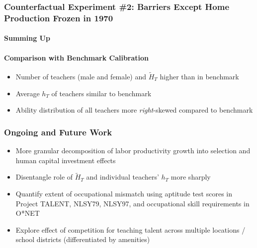 \documentclass[11pt,hyperref={bookmarks=false},table,aspectratio=169]{beamer}
\begin{document}
\begin{frame}
\frametitle{Counterfactual Experiment \#2: Barriers Except \alert{Home Production} Frozen in 1970}
\framesubtitle{Summing Up}
\framesubtitle{Comparison with Benchmark Calibration}
\begin{itemize}
  \item Number of teachers (male and female) and $\widetilde{H}_T$ higher than in benchmark
  \item Average $h_T$ of teachers similar to benchmark
  \item Ability distribution of all teachers more {\it right}-skewed compared to benchmark
\end{itemize}
\end{frame}


\begin{frame}\label{conclusion}
	\frametitle{Ongoing and Future Work}
	\begin{itemize}	
		\item More granular decomposition of labor productivity growth into selection and human capital investment effects
		\item Disentangle role of $\tilde{H}_T$ and individual teachers' $h_T$ more sharply
		\item Quantify extent of occupational mismatch using aptitude test scores in Project TALENT, NLSY79, NLSY97, and occupational skill requirements in O*NET
		\item Explore effect of competition for teaching talent across multiple locations / school districts (differentiated by amenities)
	\end{itemize}
\end{frame}
\end{document}
